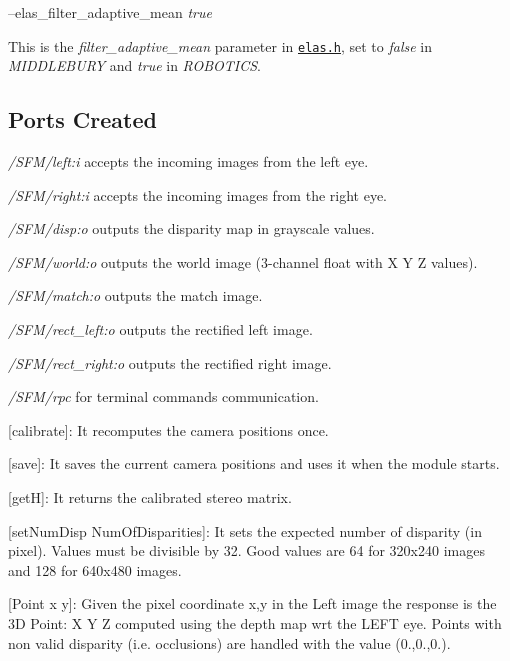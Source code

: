 --elas\+\_\+filter\+\_\+adaptive\+\_\+mean {\itshape true} 
\begin{DoxyItemize}
\item This is the {\itshape filter\+\_\+adaptive\+\_\+mean} parameter in \href{https://github.com/robotology/stereo-vision/tree/master/lib/elas/include/elas.h}{\tt elas.\+h}, set to {\itshape false} in {\itshape M\+I\+D\+D\+L\+E\+B\+U\+R\+Y} and {\itshape true} in {\itshape R\+O\+B\+O\+T\+I\+C\+S}.
\end{DoxyItemize}\hypertarget{group__SFM_portsc_sec}{}\subsection{Ports Created}\label{group__SFM_portsc_sec}

\begin{DoxyItemize}
\item {\itshape  /\+S\+F\+M/left\+:i } accepts the incoming images from the left eye.
\item {\itshape  /\+S\+F\+M/right\+:i } accepts the incoming images from the right eye.
\item {\itshape  /\+S\+F\+M/disp\+:o } outputs the disparity map in grayscale values.
\item {\itshape  /\+S\+F\+M/world\+:o} outputs the world image (3-\/channel float with X Y Z values).
\item {\itshape  /\+S\+F\+M/match\+:o} outputs the match image.
\item {\itshape  /\+S\+F\+M/rect\+\_\+left\+:o} outputs the rectified left image.
\item {\itshape  /\+S\+F\+M/rect\+\_\+right\+:o} outputs the rectified right image.
\item {\itshape  /\+S\+F\+M/rpc } for terminal commands communication.
\begin{DoxyItemize}
\item \mbox{[}calibrate\mbox{]}\+: It recomputes the camera positions once.
\item \mbox{[}save\mbox{]}\+: It saves the current camera positions and uses it when the module starts.
\item \mbox{[}get\+H\mbox{]}\+: It returns the calibrated stereo matrix.
\item \mbox{[}set\+Num\+Disp Num\+Of\+Disparities\mbox{]}\+: It sets the expected number of disparity (in pixel). Values must be divisible by 32. Good values are 64 for 320x240 images and 128 for 640x480 images.
\item \mbox{[}Point x y\mbox{]}\+: Given the pixel coordinate x,y in the Left image the response is the 3\+D Point\+: X Y Z computed using the depth map wrt the L\+E\+F\+T eye. Points with non valid disparity (i.\+e. occlusions) are handled with the value (0.,0.,0.).

\end{DoxyItemize}
\end{DoxyItemize}
